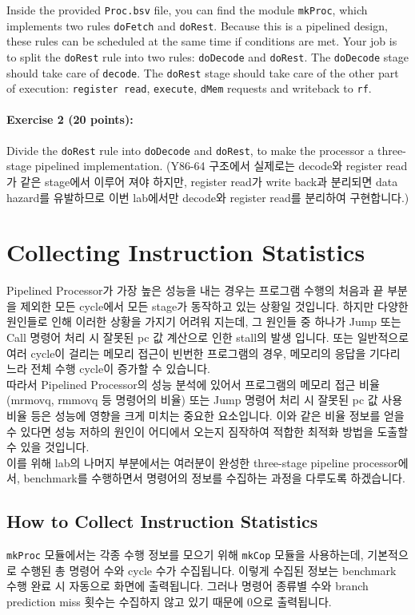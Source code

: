 \documentclass{article}
\begin{document}
Inside the provided \texttt{Proc.bsv} file, you can find the module
\texttt{mkProc}, which implements two rules \texttt{doFetch} and
\texttt{doRest}. Because this is a pipelined design,
these rules can be scheduled at the same time if conditions are met.
Your job is to split the \texttt{doRest} rule into two rules:
\texttt{doDecode} and \texttt{doRest}.
The \texttt{doDecode} stage should take care of \texttt{decode}.
The \texttt{doRest} stage should take care of the other part of
execution: \texttt{register read}, \texttt{execute}, \texttt{dMem} requests and writeback to \texttt{rf}.

\noindent \paragraph{\bf Exercise 2 (20 points):} Divide the
\texttt{doRest} rule into \texttt{doDecode} and \texttt{doRest},
to make the processor a three-stage pipelined implementation.
(Y86-64 구조에서 실제로는 decode와 register read가 같은 stage에서 이루어 져야 하지만, register read가 write back과 분리되면 
data hazard를 유발하므로
이번 lab에서만 decode와 register read를 분리하여 구현합니다.)

\section{Collecting Instruction Statistics}
Pipelined Processor가 가장 높은 성능을 내는 경우는 프로그램 수행의 처음과 끝 부분을 제외한
모든 cycle에서 모든 stage가 동작하고 있는 상황일 것입니다. 하지만 다양한 원인들로 인해 이러한 상황을 가지기 어려워 지는데,
그 원인들 중 하나가 Jump 또는 Call 명령어 처리 시 잘못된 pc 값 계산으로 인한 stall의 발생 입니다. 또는 일반적으로
여러 cycle이 걸리는 메모리 접근이 빈번한 프로그램의 경우, 메모리의 응답을 기다리느라 전체 수행 cycle이 증가할 수 있습니다.
\\따라서 Pipelined Processor의 성능 분석에 있어서 프로그램의 메모리 접근 비율(mrmovq, rmmovq 등 명령어의 비율) 또는 Jump 명령어 처리
시 잘못된 pc 값 사용 비율 등은 성능에 영향을 크게 미치는 중요한 요소입니다. 이와 같은 비율 정보를 얻을 수 있다면
성능 저하의 원인이 어디에서 오는지 짐작하여 적합한 최적화 방법을 도출할 수 있을 것입니다.
\\이를 위해 lab의 나머지 부분에서는 여러분이 완성한 three-stage pipeline processor에서,
benchmark를 수행하면서 명령어의 정보를 수집하는 과정을 다루도록 하겠습니다.

\subsection{How to Collect Instruction Statistics}
\texttt{mkProc} 모듈에서는 각종 수행 정보를 모으기 위해 \texttt{mkCop} 모듈을 사용하는데,
기본적으로 수행된 총 명령어 수와 cycle 수가 수집됩니다.
이렇게 수집된 정보는 benchmark 수행 완료 시 자동으로 화면에 출력됩니다.
그러나 명령어 종류별 수와 branch prediction miss 횟수는 수집하지 않고 있기 때문에 0으로 출력됩니다.
\end{document}
